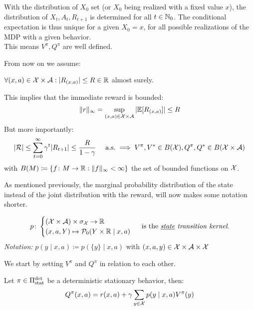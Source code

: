 \begin{remark}
With the distribution of \(X_0\) set (or \(X_0\) being realized with a fixed value \(x\)), the distribution of \(X_t, A_t,R_{t+1}\) is determined for all \(t\in\mathbb{N}_0\). The conditional expectation is thus unique for a given \(X_0=x\), for all possible realizations of the MDP with a given behavior. \\
This means \(V^\pi, Q^\pi\) are well defined.
\end{remark}
From now on we assume:
\begin{assumption} 
	\(\forall (x,a)\in\mathcal{X}\times\mathcal{A}:|R_{(x,a)}|\le R\in\mathbb{R}\) almost surely.
\end{assumption}
This implies that the immediate reward is bounded:
\[
	\|r\|_{\infty}=\sup_{(x,a)\in\mathcal{X}\times\mathcal{A}}|\mathbb{E}[R_{(x,a)}]|\le R
\]
But more importantly:
\[
	|\mathcal{R}|\le\sum_{t=0}^\infty \gamma^t |R_{t+1}|\le 
	\frac{R}{1-\gamma} \quad\text{ a.s.} 
	\implies V^\pi,V^* \in B(\mathcal{X}), Q^\pi,Q^* \in B(\mathcal{X}\times\mathcal{A})
\]
with \(B(M)\coloneqq \{f\colon M\to\mathbb{R} : \|f\|_\infty <\infty \} \) the set of bounded functions on \(\mathcal{X}\). 

As mentioned previously, the marginal probability distribution of the state instead of the joint distribution with the reward, will now makes some notation shorter.  
\begin{definition}
	\[
	p\colon 
	\begin{cases}
		(\mathcal{X}\times\mathcal{A})\times\sigma_{\mathcal{X}}\to\mathbb{R}\\
		(x,a,Y)\mapsto \mathcal{P}_0(Y\times\mathbb{R}\mid x,a)
	\end{cases}\text{ is the \emph{\underline{state} transition kernel}.}
	\] 
\emph{Notation:} \(p(y\mid x,a)\coloneqq p(\{y\}\mid x,a)\) with \((x,a,y)\in\mathcal{X}\times\mathcal{A}\times\mathcal{X}\)
\end{definition}

We start by setting \(V^\pi\) and \(Q^\pi\) in relation to each other.

\begin{prop}\label{expand Q^pi} Let \(\pi\in\Pi_{\textnormal{stat}}^{\textnormal{det}}\) be a deterministic stationary behavior, then:
	\[Q^\pi(x,a)=r(x,a)+\gamma\sum_{y\in\mathcal{X}}p(y\mid x,a)V^\pi(y)	\]
\end{prop}

